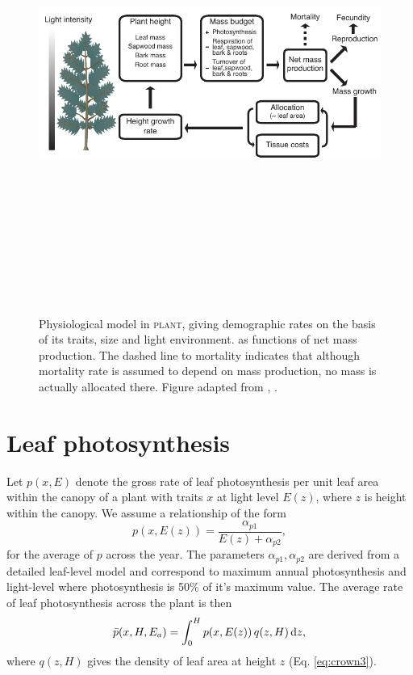 \documentclass[10pt,twoside]{article}
\newcommand{\plant}{\textsc{plant}}
\begin{document}
\begin{figure}[h!]
\centering
\includegraphics[width=15cm,height=15cm,keepaspectratio]{../figures/schematic-phys}
\caption{Physiological model in {\plant}, giving
demographic rates on the basis of its traits, size and light environment. as functions of
net mass production. The dashed line to mortality indicates that although mortality rate is assumed to depend on mass production, no
mass is actually allocated there. Figure adapted from
\citet{Falster-2011}, \citet{Falster-2015}.}
\label{fig:schematic-phys}
\end{figure}

\section{Leaf photosynthesis}\label{leaf-photosynthesis}

Let \(p(x, E)\) denote the gross rate of leaf photosynthesis per unit
leaf area within the canopy of a plant with traits \(x\) at light
level \(E(z)\), where \(z\) is height within the canopy.
We assume a relationship of the form
\begin{equation}\label{eq:photosynthesis}
p(x, E(z)) = \frac{\alpha_{p1}}{E(z) + \alpha_{p2}},
\end{equation}
for the average of \(p\) across the year. The parameters
\(\alpha_{p1}, \alpha_{p2}\) are derived from a detailed leaf-level
model and correspond to maximum annual photosynthesis and light-level
where photosynthesis is 50\% of it's maximum value. The average rate of
leaf photosynthesis across the plant is then
\begin{equation}\label{eq:photosynthesis_av}
\bar{p}(x, H, E_a) = \int_0^H p(x, E(z)) \, q(z, H) \, {\rm d}z,
\end{equation}
where \(q(z, H)\) gives the density of leaf area at height \(z\) (Eq.
\ref{eq:crown3}).
\end{document}
